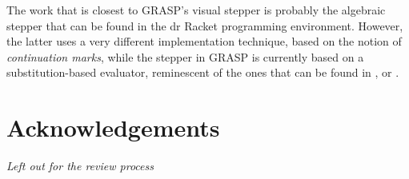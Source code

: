 \documentclass[acmsmall]{acmart}
\begin{document}
The work that is closest to GRASP's visual stepper is probably the
algebraic stepper that can be found in the dr Racket programming
environment\cite{Clements}. However, the latter uses a very different
implementation technique, based on the notion of \textit{continuation
  marks}, while the stepper in GRASP is currently based on a
substitution-based evaluator, reminescent of the ones that can be
found in \cite{Maritime}, \cite{Meyer} or \cite{Pedersen}.

\section*{Acknowledgements}

\textit{Left out for the review process}

\end{document}
